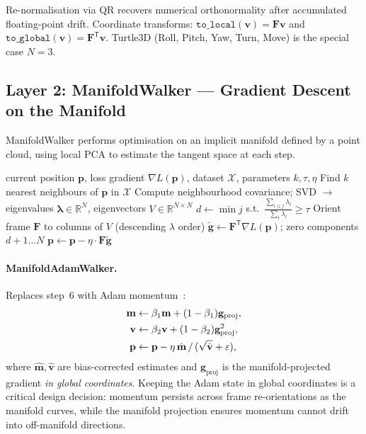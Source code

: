 \documentclass[12pt,letterpaper]{article}
\newcommand{\RR}{\mathbb{R}}
\newcommand{\bF}{\mathbf{F}}
\newcommand{\bp}{\mathbf{p}}
\newcommand{\bg}{\mathbf{g}}
\newcommand{\T}{\mathsf{T}}
\begin{document}
Re-normalisation via QR recovers numerical orthonormality after
accumulated floating-point drift.  Coordinate transforms:
$\texttt{to\_local}(\mathbf{v}) = \bF\mathbf{v}$ and
$\texttt{to\_global}(\mathbf{v}) = \bF^\T\mathbf{v}$.
Turtle3D (Roll, Pitch, Yaw, Turn, Move) is the special case $N=3$.

\subsection{Layer 2: ManifoldWalker --- Gradient Descent on the Manifold}

ManifoldWalker performs optimisation on an implicit manifold defined by a point
cloud, using local PCA to estimate the tangent space at each step.

\begin{algorithm}[h]
\caption{ManifoldWalker single step}
\begin{algorithmic}[1]
\Require current position $\bp$, loss gradient $\nabla L(\bp)$,
         dataset $\mathcal{X}$, parameters $k,\tau,\eta$
\State Find $k$ nearest neighbours of $\bp$ in $\mathcal{X}$
\State Compute neighbourhood covariance; SVD $\to$ eigenvalues
       $\bm\lambda \in \RR^N$, eigenvectors $V \in \RR^{N\times N}$
\State $d \leftarrow \min j$ s.t.\
       $\frac{\sum_{i\le j}\lambda_i}{\sum_i\lambda_i} \ge \tau$
       \quad\Comment{intrinsic dimension}
\State Orient frame $\bF$ to columns of $V$ (descending $\lambda$ order)
\State $\tilde{\bg} \leftarrow \bF^\T\nabla L(\bp)$;
       zero components $d{+}1\ldots N$ \quad{}
\State $\bp \leftarrow \bp - \eta\cdot\bF\tilde{\bg}$
\end{algorithmic}
\end{algorithm}

\paragraph{ManifoldAdamWalker.}
Replaces step~6 with Adam momentum~\cite{adam}:
\begin{align}
  \mathbf{m} &\leftarrow \beta_1\mathbf{m} + (1-\beta_1)\bg_\text{proj},\notag\\
  \mathbf{v} &\leftarrow \beta_2\mathbf{v} + (1-\beta_2)\bg_\text{proj}^2,\notag\\
  \bp &\leftarrow \bp - \eta\,\hat{\mathbf{m}}\,/\,(\sqrt{\hat{\mathbf{v}}}+\varepsilon),
  \label{eq:adam}
\end{align}
where $\hat{\mathbf{m}},\hat{\mathbf{v}}$ are bias-corrected estimates and
$\bg_\text{proj}$ is the manifold-projected gradient \emph{in global
coordinates}.  Keeping the Adam state in global coordinates is a critical
design decision: momentum persists across frame re-orientations as the manifold
curves, while the manifold projection ensures momentum cannot drift into
off-manifold directions.
\end{document}

